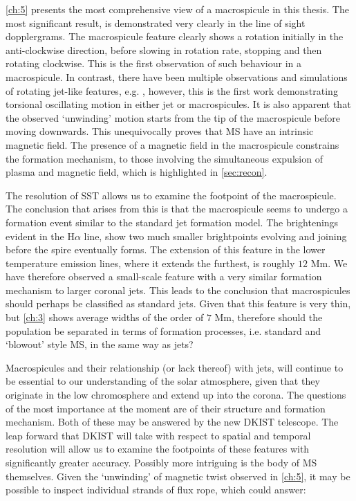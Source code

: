 \cref{ch:5} presents the most comprehensive view of a macrospicule in this thesis.
The most significant result, is demonstrated very clearly in the line of sight dopplergrams.
The macrospicule feature clearly shows a rotation initially in the anti-clockwise direction, before slowing in rotation rate, stopping and then rotating clockwise.
This is the first observation of such behaviour in a macrospicule.
In contrast, there have been multiple observations and simulations of rotating jet-like features, e.g. \cite{Kamio2010, Curdt2011, Majarska2011}, however, this is the first work demonstrating torsional oscillating motion in either jet or macrospicules.
It is also apparent that the observed `unwinding' motion starts from the tip of the macrospicule before moving downwards.  
This unequivocally proves that MS have an intrinsic magnetic field.
The presence of a magnetic field in the macrospicule constrains the formation mechanism, to those involving the simultaneous expulsion of plasma and magnetic field, which is highlighted in \cref{sec:recon}.

The resolution of SST allows us to examine the footpoint of the macrospicule.
The conclusion that arises from this is that the macrospicule seems to undergo a formation event similar to the \cite{Shibata1992} standard jet formation model.
The brightenings evident in the H$\alpha$ line, show two much smaller brightpoints evolving and joining before the spire eventually forms.
The extension of this feature in the lower temperature emission lines, where it extends the furthest, is roughly $12$ Mm.
We have therefore observed a small-scale feature with a very similar formation mechanism to larger coronal jets.
This leads to the conclusion that macrospicules should perhaps be classified as standard jets.
Given that this feature is very thin, but \cref{ch:3} shows average widths of the order of $7$ Mm, therefore should the population be separated in terms of formation processes, i.e. standard and `blowout' style MS, in the same way as jets?

Macrospicules and their relationship (or lack thereof) with jets, will continue to be essential to our understanding of the solar atmosphere, given that they originate in the low chromosphere and extend up into the corona.
The questions of the most importance at the moment are of their structure and formation mechanism.
Both of these may be answered by the new DKIST telescope.
The leap forward that DKIST will take with respect to spatial and temporal resolution will allow us to examine the footpoints of these features with significantly greater accuracy.
Possibly more intriguing is the body of MS themselves.
Given the `unwinding' of magnetic twist observed in \cref{ch:5}, it may be possible to inspect individual strands of flux rope, which could answer:


